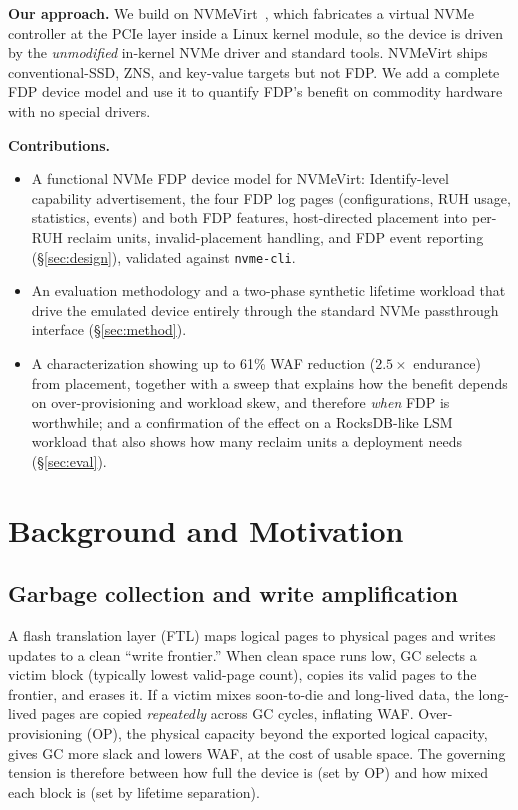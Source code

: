 \documentclass[conference,10pt]{IEEEtran}
\begin{document}
\textbf{Our approach.} We build on NVMeVirt~\cite{nvmevirt:fast23}, which
fabricates a virtual NVMe controller at the PCIe layer inside a Linux kernel
module, so the device is driven by the \emph{unmodified} in-kernel NVMe driver
and standard tools. NVMeVirt ships conventional-SSD, ZNS, and key-value targets
but not FDP. We add a complete FDP device model and use it to quantify FDP's
benefit on commodity hardware with no special drivers.

\textbf{Contributions.}
\begin{itemize}
\item A functional NVMe FDP device model for NVMeVirt: Identify-level capability
advertisement, the four FDP log pages (configurations, RUH usage, statistics,
events) and both FDP features, host-directed placement into per-RUH reclaim
units, invalid-placement handling, and FDP event reporting
(\S\ref{sec:design}), validated against \texttt{nvme-cli}.
\item An evaluation methodology and a two-phase synthetic lifetime workload that
drive the emulated device entirely through the standard NVMe passthrough
interface (\S\ref{sec:method}).
\item A characterization showing up to 61\% WAF reduction ($2.5\times$
endurance) from placement, together with a sweep that explains how the benefit
depends on over-provisioning and workload skew, and therefore \emph{when} FDP is
worthwhile; and a confirmation of the effect on a RocksDB-like LSM workload that
also shows how many reclaim units a deployment needs (\S\ref{sec:eval}).
\end{itemize}

\section{Background and Motivation}
\label{sec:bg}

\subsection{Garbage collection and write amplification}
A flash translation layer (FTL) maps logical pages to physical pages and writes
updates to a clean ``write frontier.'' When clean space runs low, GC selects a
victim block (typically lowest valid-page count), copies its valid pages to the
frontier, and erases it. If a victim mixes soon-to-die and long-lived data, the
long-lived pages are copied \emph{repeatedly} across GC cycles, inflating WAF.
Over-provisioning (OP), the physical capacity beyond the exported logical
capacity, gives GC more slack and lowers WAF, at the cost of usable space. The
governing tension is therefore between how full the device is (set by OP) and how
mixed each block is (set by lifetime separation).
\end{document}
